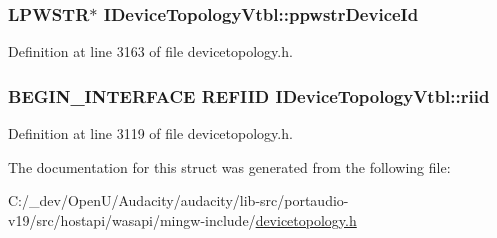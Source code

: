 \subsubsection[{\texorpdfstring{ppwstr\+Device\+Id}{ppwstrDeviceId}}]{ {\bf L\+P\+W\+S\+TR}$\ast$ I\+Device\+Topology\+Vtbl\+::ppwstr\+Device\+Id}\hypertarget{struct_i_device_topology_vtbl_a30e9bdf6ea82c34b136dccfb368f87b1}{}\label{struct_i_device_topology_vtbl_a30e9bdf6ea82c34b136dccfb368f87b1}


Definition at line 3163 of file devicetopology.\+h.

\subsubsection[{\texorpdfstring{riid}{riid}}]{\setlength{\rightskip}{0pt plus 5cm}B\+E\+G\+I\+N\+\_\+\+I\+N\+T\+E\+R\+F\+A\+CE {\bf R\+E\+F\+I\+ID} I\+Device\+Topology\+Vtbl\+::riid}\hypertarget{struct_i_device_topology_vtbl_a889bb4c3f428d49897c3d71bc92a238d}{}\label{struct_i_device_topology_vtbl_a889bb4c3f428d49897c3d71bc92a238d}


Definition at line 3119 of file devicetopology.\+h.



The documentation for this struct was generated from the following file\+:\begin{DoxyCompactItemize}
\item 
C\+:/\+\_\+dev/\+Open\+U/\+Audacity/audacity/lib-\/src/portaudio-\/v19/src/hostapi/wasapi/mingw-\/include/\hyperlink{devicetopology_8h}{devicetopology.\+h}\end{DoxyCompactItemize}
